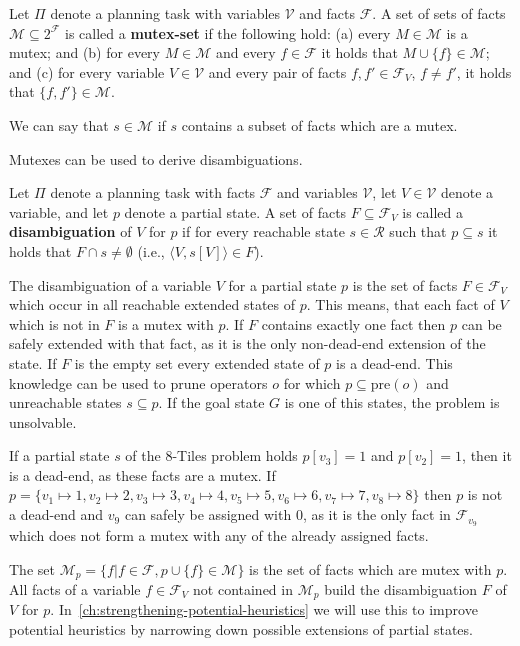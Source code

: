 \begin{definition}
    Let $\Pi$ denote a planning task with variables $\mathcal{V}$ and facts $\mathcal{F}$.
    A set of sets of facts $\mathcal{M}\subseteq 2^{\mathcal{F}}$ is called a \textbf{mutex-set} if the following hold:
    (a) every $M\in\mathcal{M}$ is a mutex;
    and (b) for every $M\in\mathcal{M}$ and every $f\in\mathcal{F}$ it holds that $M\cup\{f\}\in\mathcal{M}$;
    and (c) for every variable $V\in\mathcal{V}$ and every pair of facts $f, f'\in\mathcal{F}_V$, $f\neq f'$, it holds
    that $\{f,f'\}\in\mathcal{M}$.
\end{definition}

We can say that $s\in\mathcal{M}$ if $s$ contains a subset of facts which are a mutex.

Mutexes can be used to derive disambiguations.
\begin{definition}
    Let $\Pi$ denote a planning task with facts $\mathcal{F}$ and variables $\mathcal{V}$, let $V\in\mathcal{V}$ denote
    a variable, and let $p$ denote a partial state.
    A set of facts $F\subseteq\mathcal{F}_V$ is called a \textbf{disambiguation} of $V$ for $p$ if for every reachable state
    $s\in\mathcal{R}$ such that $p\subseteq s$ it holds that $F\cap s\neq\emptyset$ (i.e., $\langle V,s[V]\rangle\in F$).
\end{definition}

The disambiguation of a variable $V$ for a partial state $p$ is the set of facts $F\in\mathcal{F}_V$ which occur in all reachable extended states of $p$.
This means, that each fact of $V$ which is not in $F$ is a mutex with $p$.
If $F$ contains exactly one fact then $p$ can be safely extended with that fact, as it is the only non-dead-end extension of the state.
If $F$ is the empty set every extended state of $p$ is a dead-end.
This knowledge can be used to prune operators $o$ for which $p\subseteq\text{pre}(o)$ and unreachable states $s\subseteq p$.
If the goal state $G$ is one of this states, the problem is unsolvable.

If a partial state $s$ of the 8-Tiles problem holds $p[v_3] = 1$ and $p[v_2] = 1$, then it is a dead-end, as these facts are a mutex.
If $p = \{v_1\mapsto1, v_2\mapsto2, v_3\mapsto3, v_4\mapsto4, v_5\mapsto5, v_6\mapsto6, v_7\mapsto7, v_8\mapsto8\}$ then $p$ is not a dead-end and $v_9$ can safely be assigned with $0$, as it is the only fact in $\mathcal{F}_{v_9}$ which does not form a mutex with any of the already assigned facts.

The set $\mathcal{M}_p=\{f|f\in\mathcal{F}, p\cup\{f\}\in\mathcal{M}\}$ is the set of facts which are mutex with $p$.
All facts of a variable $f\in\mathcal{F}_V$ not contained in $\mathcal{M}_p$ build the disambiguation $F$ of $V$ for $p$.
In~\ref{ch:strengthening-potential-heuristics} we will use this to improve potential heuristics by narrowing down possible extensions of partial states.


